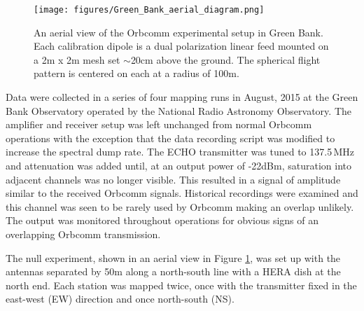 \documentclass[preprint2,numberedappendix,tighten,twocolappendix]{aastex6}
\begin{document}
\begin{figure}
\begin{center}
\texttt{[image: figures/Green\_Bank\_aerial\_diagram.png]}
\caption{An aerial view of the Orbcomm experimental setup in Green Bank. Each calibration dipole is a dual polarization linear feed mounted on a 2m x 2m mesh set $\sim$20cm above the ground. The spherical flight pattern is centered on each at a radius of 100m.}
\label{fig:GB_aerial}
\end{center}
\end{figure}


Data were collected in a series of four mapping runs in August, 2015 at the Green Bank Observatory operated by the National Radio Astronomy Observatory.  The amplifier and receiver setup was left unchanged from normal Orbcomm operations with the exception that the data recording script was modified to increase the spectral dump rate. The ECHO transmitter was tuned to 137.5\,MHz and attenuation was added until, at an output power of -22dBm, saturation into adjacent channels was no longer visible.  This resulted in a signal of amplitude similar to the received Orbcomm signals. Historical recordings were examined and this channel was seen to be rarely used by Orbcomm making an overlap unlikely.  The output was monitored throughout operations for obvious signs of an overlapping Orbcomm transmission.

The null experiment, shown in an aerial view in Figure \ref{fig:GB_aerial}, was set up with the antennas separated by 50m along a north-south line with a HERA dish at the north end.  Each station was mapped twice, once with the transmitter fixed in the east-west (EW) direction and once north-south (NS).

\end{document}
